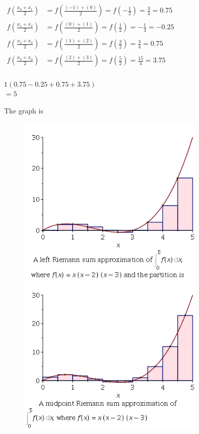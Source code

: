 \documentclass{article}
\begin{document}
$\begin{aligned} f \left( \frac { x _ { 0 } + x _ { 1 } } { 2 } \right) & = f \left( \frac { ( - 1 ) + ( 0 ) } { 2 } \right) = f \left( - \frac { 1 } { 2 } \right) = \frac { 3 } { 4 } = 0.75 \\ f \left( \frac { x _ { 1 } + x _ { 2 } } { 2 } \right) & = f \left( \frac { ( 0 ) + ( 1 ) } { 2 } \right) = f \left( \frac { 1 } { 2 } \right) = - \frac { 1 } { 4 } = - 0.25 \\ f \left( \frac { x _ { 2 } + x _ { 3 } } { 2 } \right) & = f \left( \frac { ( 1 ) + ( 2 ) } { 2 } \right) = f \left( \frac { 3 } { 2 } \right) = \frac { 3 } { 4 } = 0.75 \\ f \left( \frac { x _ { 3 } + x _ { 4 } } { 2 } \right) & = f \left( \frac { ( 2 ) + ( 3 ) } { 2 } \right) = f \left( \frac { 5 } { 2 } \right) = \frac { 15 } { 4 } = 3.75 \end{aligned}$\\
\\
$1 ( 0.75 - 0.25 + 0.75 + 3.75 ) $ \\
$= 5$

The graph is
\begin{figure}[H]
	\includegraphics[width=0.8\textwidth, height=0.6\textwidth]{left_rei.png}
	\includegraphics[width=0.8\textwidth, height=0.6\textwidth]{mid_rei.png}
\end{figure}
\end{document}
